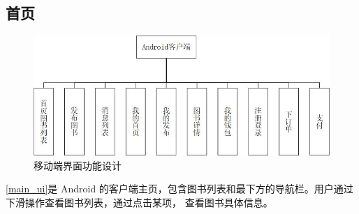 \subsection{首页}

\begin{figure}[h]
	\centering
	\includegraphics[scale=0.7]{Chapters/UML/android_ui.jpg}
	\caption{移动端界面功能设计}
	\label{android_ui}
\end{figure}

\cref{main_ui}是 Android 的客户端主页，包含图书列表和最下方的导航栏。用户通过下滑操作查看图书列表，通过点击某项，
	查看图书具体信息。
	
